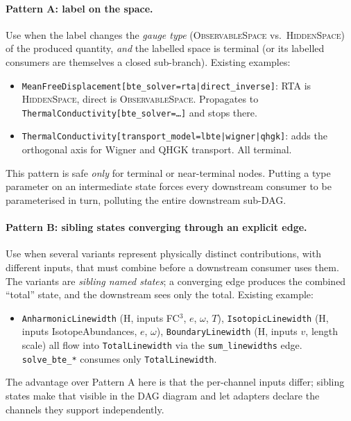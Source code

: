 \documentclass[11pt,a4paper]{article}
\begin{document}
\paragraph{Pattern A: label on the space.} Use when the label changes the
\emph{gauge type} (\textsc{ObservableSpace} vs.\ \textsc{HiddenSpace}) of the
produced quantity, \emph{and} the labelled space is terminal (or its
labelled consumers are themselves a closed sub-branch). Existing examples:
\begin{itemize}[leftmargin=2em]
  \item \texttt{MeanFreeDisplacement[bte\_solver=rta|direct\_inverse]}:
        RTA is \textsc{HiddenSpace}, direct is \textsc{ObservableSpace}. Propagates
        to \texttt{ThermalConductivity[bte\_solver=\ldots]} and stops there.
  \item \texttt{ThermalConductivity[transport\_model=lbte|wigner|qhgk]}:
        adds the orthogonal axis for Wigner and QHGK transport. All terminal.
\end{itemize}
This pattern is safe \emph{only} for terminal or near-terminal nodes. Putting a
type parameter on an intermediate state forces every downstream consumer to be
parameterised in turn, polluting the entire downstream sub-DAG.

\paragraph{Pattern B: sibling states converging through an explicit edge.}
Use when several variants represent physically distinct contributions, with
different inputs, that must combine before a downstream consumer uses them.
The variants are \emph{sibling named states}; a converging edge produces the
combined ``total'' state, and the downstream sees only the total. Existing
example:
\begin{itemize}[leftmargin=2em]
  \item \texttt{AnharmonicLinewidth} (\textsc{H}, inputs FC$^3$, $e$, $\omega$, $T$),
        \texttt{IsotopicLinewidth} (\textsc{H}, inputs IsotopeAbundances, $e$,
        $\omega$), \texttt{BoundaryLinewidth} (\textsc{H}, inputs $v$, length
        scale) all flow into \texttt{TotalLinewidth} via the
        \texttt{sum\_linewidths} edge. \texttt{solve\_bte\_*} consumes only
        \texttt{TotalLinewidth}.
\end{itemize}
The advantage over Pattern A here is that the per-channel inputs differ;
sibling states make that visible in the DAG diagram and let adapters declare
the channels they support independently.
\end{document}

